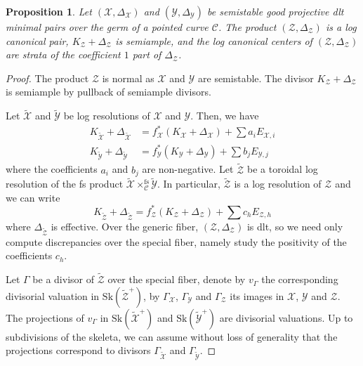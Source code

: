 \documentclass{amsart}%
\numberwithin{equation}{subsection}
\theoremstyle{plain2}
\newtheorem{prop}[equation]{Proposition}
\theoremstyle{definition2}
\theoremstyle{stepstyle}
\theoremstyle{point}
\theoremstyle{subpoint}
\newcommand{\cX}{\ensuremath{\mathscr{X}}}
\newcommand{\cC}{\ensuremath{\mathscr{C}}}
\newcommand{\cY}{\ensuremath{\mathscr{Y}}}
\newcommand{\cZ}{\ensuremath{\mathscr{Z}}}
\renewcommand{\cY}{\ensuremath{\mathscr{Y}}}
\newcommand{\Sk}{\mathrm{Sk}}
\begin{document}
\begin{prop} \label{prop product of dlt minimal pairs}
Let $(\cX,\Delta_{\cX})$ and $(\cY,\Delta_{\cY})$ be semistable good projective dlt minimal pairs over the germ of a pointed curve $\cC$. The product $(\cZ,\Delta_{\cZ})$ is a log canonical pair, $K_\cZ+\Delta_{\cZ}$ is semiample, and the log canonical centers of $(\cZ,\Delta_{\cZ})$ are strata of the coefficient $1$ part of $\Delta_{\cZ}$.
\end{prop}

\begin{proof}
The product $\cZ$ is normal as $\cX$ and $\cY$ are semistable. The divisor $K_\cZ+\Delta_{\cZ}$ is semiample by pullback of semiample divisors.

Let $\widetilde{\cX}$ and $\widetilde{\cY}$ be log resolutions of $\cX$ and $\cY$. Then, we have 
\begin{align*}
K_{\widetilde{\cX}}+ \Delta_{\widetilde{\cX}}&= f_\cX^*(K_\cX + \Delta_{\cX}) + \sum a_i E_{\cX,i} \\
K_{\widetilde{\cY}}+ \Delta_{\widetilde{\cY}}&= f_\cY^*(K_\cY + \Delta_{\cY}) + \sum b_j E_{\cY,j}
\end{align*} where the coefficients $a_i$ and $b_j$ are non-negative. Let $\widetilde{\cZ}$ be a toroidal log resolution of the fs product $\widetilde{\cX} \times^{\text{fs}}_\cC \widetilde{\cY}$. In particular, $\widetilde{\cZ}$ is a log resolution of $\cZ$ and we can write $$K_{\widetilde{\cZ}}+ \Delta_{\widetilde{\cZ}}= f_\cZ^*(K_\cZ + \Delta_{\cZ}) + \sum c_h E_{\cZ,h}$$ where $\Delta_{\widetilde{\cZ}}$ is effective. Over the generic fiber, $(\cZ,\Delta_{\cZ})$ is dlt, so we need only compute discrepancies over the special fiber, namely study the positivity of the coefficients $c_h$. 

Let $\Gamma$ be a divisor of $\widetilde{\cZ}$ over the special fiber, denote by $v_\Gamma$ the corresponding divisorial valuation in $\Sk(\widetilde{\cZ}^+)$, by $\Gamma_\cX$, $\Gamma_\cY$ and $\Gamma_{\cZ}$ its images in $\cX$, $\cY$ and $\cZ$. The projections of $v_\Gamma$ in $\Sk(\widetilde{\cX}^+)$ and $\Sk(\widetilde{\cY}^+)$ are divisorial valuations. Up to subdivisions of the skeleta, we can assume without loss of generality that the projections correspond to divisors $\Gamma_{\widetilde{\cX}}$ and $\Gamma_{\widetilde{\cY}}$.


\end{proof}
\end{document}

